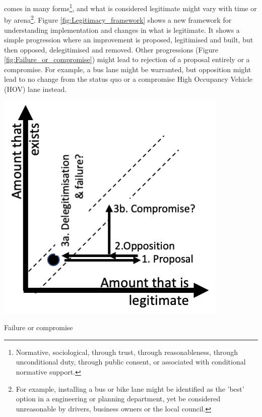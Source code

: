 \documentclass{tufte-handout}
\begin{document}
 comes in many forms\footnote{Normative, sociological, through trust, through reasonableness, through unconditional duty, through public consent, or associated with conditional normative support.}, and what is considered legitimate might vary with time or by arena\footnote{For example, installing a bus or bike lane might be identified as the 'best' option in a engineering or planning department, yet be considered unreasonable by drivers, business owners or the local council.}. Figure \ref{fig:Legitimacy_framework} shows a new framework for understanding implementation and changes in what is legitimate.  It shows a simple progression where an improvement is proposed, legitimised and built, but then opposed, delegitimised and removed. Other progressions (Figure \ref{fig:Failure_or_compromise}) might lead to rejection of a proposal entirely or a compromise. For example, a bus lane might be warranted, but opposition might lead to no change from the status quo or a compromise High Occupancy Vehicle (HOV) lane instead. 

\begin{marginfigure}%
  \includegraphics[width=\linewidth]{Failure_or_compromise}
  \caption{Failure or compromise}
  \label{fig:Failure_or_compromise}
\end{marginfigure}
\end{document}
